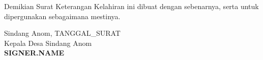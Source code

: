 \documentclass[a4paper, 12pt]{article}
\begin{document}
Demikian Surat Keterangan Kelahiran ini dibuat dengan sebenarnya, serta untuk dipergunakan sebagaimana mestinya.

\vspace{1.5cm}

\begin{flushright}
    \begin{minipage}{0.5\textwidth}
        \centering
        Sindang Anom, {{TANGGAL_SURAT}} \\
        Kepala Desa Sindang Anom \\
        \vspace{2.5cm} 
        \textbf{{{SIGNER.NAME}}}
    \end{minipage}
\end{flushright}
\end{document}
